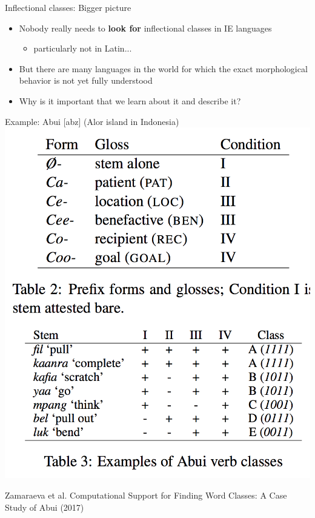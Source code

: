 \documentclass{beamer}
\begin{document}
\begin{frame}{Inflectional classes: Bigger picture}
  \begin{itemize}
  \item Nobody really needs to {\bf look for} inflectional classes in IE languages
    \begin{itemize}
    \item particularly not in Latin...
    \end{itemize}
  \item But there are many languages in the world for which the exact morphological behavior is not yet fully understood
  \item Why is it important that we learn about it and describe it?
  \end{itemize}
\end{frame}

\begin{frame}{Example: Abui [abz] (Alor island in Indonesia)}
  \includegraphics[height=0.8\textheight]{figures/abz}
  
  {\tiny Zamaraeva et al. Computational Support for Finding Word
    Classes: A Case Study of Abui (2017)}
\end{frame}
\end{document}
